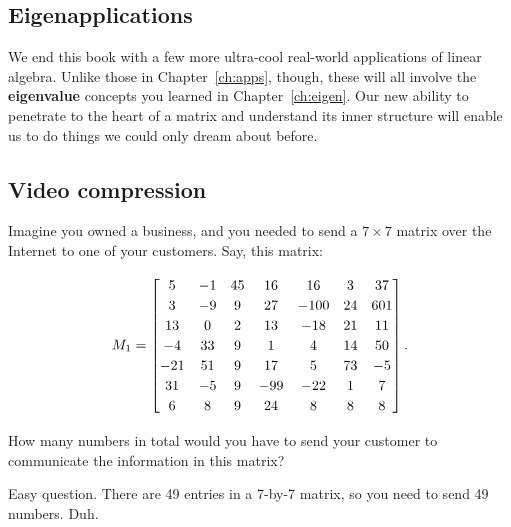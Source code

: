 

\begin{alttitles}

\chapter{Eigenapplications}

We end this book with a few more ultra-cool real-world applications of linear
algebra. Unlike those in Chapter~\ref{ch:apps}, though, these will all involve
the \textbf{eigenvalue} concepts you learned in Chapter~\ref{ch:eigen}. Our
new ability to penetrate to the heart of a matrix and understand its inner
structure will enable us to do things we could only dream about before.

\pagebreak

\renewcommand{\thesubsection}{V\arabic{subsection}.}%
\section{Video compression}

Imagine you owned a business, and you needed to send a $7\times 7$ matrix over
the Internet to one of your customers. Say, this matrix:

\vspace{-.15in}
\begin{align*}
M_1 = 
\begingroup
\renewcommand*{\arraystretch}{1.2}
\begin{bmatrix}
5 & -1 & 45 & 16 & 16 & 3 & 37 \\
3 & -9 & 9  & 27 & -100 & 24 & 601 \\
13 & 0 & 2  & 13 & -18 & 21 & 11 \\
-4 & 33 & 9  & 1 & 4 & 14 & 50 \\
-21 & 51 & 9  & 17 & 5 & 73 & -5 \\
31 & -5 & 9  & -99 & -22 & 1 & 7 \\
6 & 8 & 9  & 24 & 8 & 8 & 8 \\
\end{bmatrix}.
\endgroup
\end{align*}
\vspace{-.15in}

How many numbers in total would you have to send your customer to communicate
the information in this matrix?

Easy question. There are 49 entries in a 7-by-7 matrix, so you need to send 49
numbers. Duh.

\medskip


\end{alttitles}
